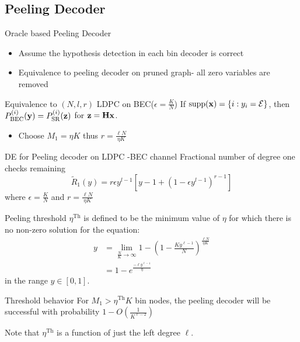 \documentclass[10pt]{beamer}
\begin{document}
\subsection{Peeling Decoder}
\begin{frame}{Oracle based Peeling Decoder}
\begin{itemize}
\item Assume the hypothesis detection in each bin decoder is correct
\item Equivalence to peeling decoder on pruned graph- all zero variables are removed
\end{itemize}
\begin{block}{Equivalence to $(N,l,r)$ LDPC on BEC($\epsilon=\frac{K}{N}$)}
If $\text{supp}(\mathbf{x})=\{i:y_i=\mathcal{E}\}$, then $P^{(i)}_{\text{BEC}}(\mathbf{y})=P^{(i)}_{\text{SR}}(\mathbf{z})$  for $\mathbf{z=Hx}$.
\end{block}
\begin{itemize}
\item Choose $M_1=\eta K$ thus $r=\frac{\ell N}{\eta K}$
\end{itemize}
\vspace{1ex}
\begin{block}{DE for Peeling decoder on LDPC -BEC channel}
Fractional number of degree one checks remaining
\begin{equation*}
\tilde{R}_1(y)=r\epsilon y^{l-1}[y-1+(1-\epsilon y^{l-1})^{r-1}]
\end{equation*}
where $\epsilon=\frac{K}{N}$ and $r=\frac{\ell N}{\eta K}$
\end{block}
\end{frame}


\begin{frame}{}
\begin{block}{Peeling threshold}
$\eta^{\text{Th}}$ is defined to be the minimum value of $\eta$ for which there is no non-zero solution for the equation:
\begin{align*}
y&=\lim_{\frac{N}{K}\rightarrow\infty}1-\left(1-\frac{Ky^{\ell-1}}{N}\right)^{\frac{\ell N}{\eta K}}\\
  &=1-e^{\frac{-\ell y^{\ell-1}}{\eta}}
\end{align*}
in the range $y\in [0,1]$.
\end{block}
\vspace{3ex}
\begin{block}{Threshold behavior}
For $M_1>\eta^{\text{Th}}K$ bin nodes, the peeling decoder will be successful with probability $1-O\left(\frac{1}{K^{\ell-2}}\right)$
\end{block}
Note that $\eta^{\text{Th}}$ is a function of just the left degree $\ell$.
\end{frame}
\end{document}
